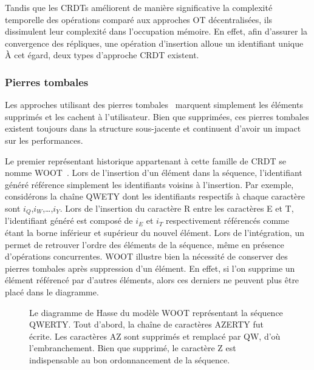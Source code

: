 Tandis que les CRDTs améliorent de manière significative la complexité
temporelle des opérations comparé aux approches OT décentralisées, ils
dissimulent leur complexité dans l'occupation mémoire. En effet, afin d'assurer
la convergence des répliques, une opération d'insertion alloue un identifiant
unique  À cet égard, deux types d'approche CRDT existent.

\subsubsection{Pierres tombales}

Les approches utilisant des pierres tombales~\cite{ahmed2011evaluating,
  conway2014language, grishchenko2010deep, oster2006data,
  preguica2009commutative, roh2011replicated, weiss2007wooki, wu2010partial,
  Yu2012stringwise} marquent simplement les éléments supprimés et les cachent à
l'utilisateur. Bien que supprimées, ces pierres tombales existent toujours dans
la structure sous-jacente et continuent d'avoir un impact sur les performances.

Le premier représentant historique appartenant à cette famille de CRDT se nomme
WOOT~\cite{oster2006data}. Lors de l'insertion d'un élément dans la séquence,
l'identifiant généré référence simplement les identifiants voisins à
l'insertion. Par exemple, considérons la chaîne QWETY dont les identifiants
respectifs à chaque caractère sont $i_Q$,$i_W$,\ldots,$i_Y$. Lors de l'insertion
du caractère R entre les caractères E et T, l'identifiant généré est composé de
$i_E$ et $i_T$ respectivement référencés comme étant la borne inférieur et
supérieur du nouvel élément. Lors de l'intégration, un 
permet de retrouver l'ordre des éléments de la séquence, même en présence
d'opérations concurrentes. WOOT illustre bien la nécessité de conserver des
pierres tombales après suppression d'un élément. En effet, si l'on supprime un
élément référencé par d'autres éléments, alors ces derniers ne peuvent plus être
placé dans le diagramme.

\begin{figure}
  \centering
  
  \caption{\label{fig:lseq:wootexample}Le diagramme de Hasse du modèle WOOT
    représentant la séquence QWERTY. Tout d'abord, la chaîne de caractères
    AZERTY fut écrite. Les caractères AZ sont supprimés et remplacé par QW, d'où
    l'embranchement. Bien que supprimé, le caractère Z est indispensable au bon
    ordonnancement de la séquence.}
\end{figure}

